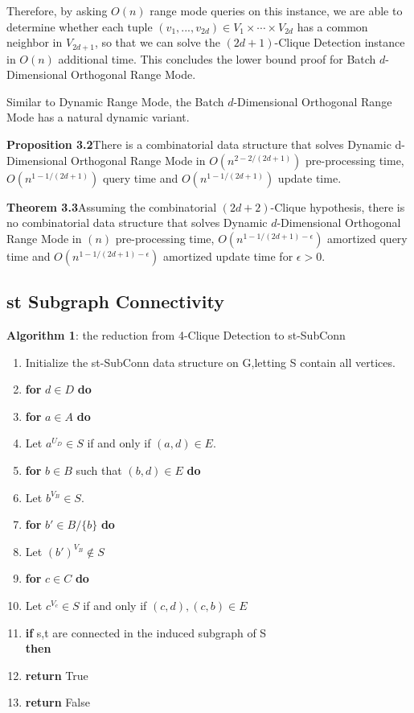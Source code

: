 \documentclass[preprint,10pt]{elsarticle}
\begin{document}
\begin{multicols}{2}
Therefore, by asking $O(n)$ range mode queries on this instance, we are able to determine whether each tuple $(v_1, ..., v_{2d}) \in V_1 \times \cdots \times V_{2d}$ has a common neighbor in $V_{2d+1}$, so that we can solve the $(2d+1)$-Clique Detection instance in $O(n)$ additional time. This concludes the lower bound proof for Batch $d$-Dimensional  Orthogonal Range Mode.


Similar to Dynamic Range Mode, the Batch $d$-Dimensional  Orthogonal Range Mode has a natural dynamic variant. 

\textbf{Proposition 3.2}\label{3.2}There is a combinatorial data structure that solves Dynamic d-Dimensional Orthogonal Range Mode in $O(n^{2-2/(2d+1)})$
pre-processing time, $O(n^{1-1/(2d+1)})$ query time and $O(n^{1-1/(2d+1)})$ update time.

\textbf{Theorem 3.3}\label{3.3}Assuming the combinatorial $(2d+2)$-Clique hypothesis, there is no combinatorial data structure that solves  Dynamic $d$-Dimensional  Orthogonal Range Mode in $(n)$ pre-processing time, $O(n^{1-1/(2d+1)-\epsilon})$ amortized query time and $O(n^{1-1/(2d+1)-\epsilon})$ amortized update time for $\epsilon > 0$.

\subsection{st Subgraph Connectivity}
\hline
\textbf{Algorithm 1}: the reduction from 4-Clique Detection to st-SubConn
\hline
\begin{enumerate}
    \item Initialize the st-SubConn data structure on G,letting S contain all vertices.
    \item  \textbf{for} $d \in D$ \textbf{do}
    \item \: \: \textbf{for} $a \in A$ \textbf{do}
    \item \: \: \:\: \: Let $a^{U_D} \in S$ if and only if $(a,d) \in E $.
    \item \:\:\: \: \textbf{for} $b \in B $ such that $(b,d) \in E$ \textbf{do}
    \item \: \:\:\:\:\: \: Let $b^{V_B} \in S.$
    \item \:\:\: \: \:\: \:\textbf{for} $ b'\in B/\{b\} $ \textbf{do}
    \item \:\:\: \: \:\: \:\: \: Let $(b')^{V_B} \notin S $
    \item  \:\:\: \: \:\: \:\textbf{for} $c \in C$ \textbf{do}
    \item  \:\:\:\: \:\: \:\: \:\: \:Let $c^{V_c} \in S$ if and only if $(c,d),(c,b) \in E$
    \item \:\:\: \: \:\: \: \textbf{if} s,t are connected in the induced subgraph of S\\ \textbf{then}
    \item \:\:\:\:\:\: \: \: \:\:\: \:\:\textbf{return} True
    \item \textbf{return} False
    

\end{enumerate}
\end{multicols}
\end{document}
